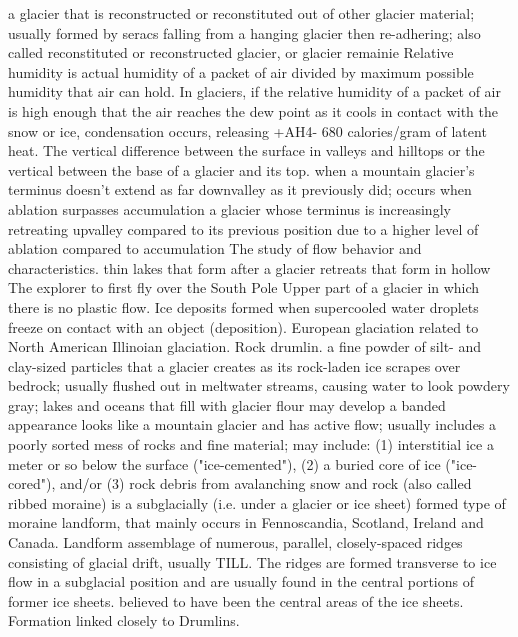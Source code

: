  a glacier that is reconstructed or reconstituted out of other glacier material; usually formed by seracs falling from a hanging glacier then re-adhering; also called reconstituted or reconstructed glacier, or glacier remainie
 Relative humidity is actual humidity of a packet of air divided by maximum possible humidity that air can hold. In glaciers, if the relative humidity of a packet of air is high enough that the air reaches the dew point as it cools in contact with the snow or ice, condensation occurs, releasing +AH4- 680 calories/gram of latent heat.
 The vertical difference between the surface in valleys and hilltops or the vertical between the base of a glacier and its top.
 when a mountain glacier's terminus doesn't extend as far downvalley as it previously did; occurs when ablation surpasses accumulation
 a glacier whose terminus is increasingly retreating upvalley compared to its previous position due to a higher level of ablation compared to accumulation
 The study of flow behavior and characteristics.
 thin lakes that form after a glacier retreats that form in hollow 
 The explorer to first fly over the South Pole
 Upper part of a glacier in which there is no plastic flow.
 Ice deposits formed when supercooled water droplets freeze on contact with an object (deposition).
 European glaciation related to North American Illinoian glaciation.
 Rock drumlin.
 a fine powder of silt- and clay-sized particles that a glacier creates as its rock-laden ice scrapes over bedrock; usually flushed out in meltwater streams, causing water to look powdery gray; lakes and oceans that fill with glacier flour may develop a banded appearance
 looks like a mountain glacier and has active flow; usually includes a poorly sorted mess of rocks and fine material; may include: (1) interstitial ice a meter or so below the surface ("ice-cemented"), (2) a buried core of ice ("ice-cored"), and/or (3) rock debris from avalanching snow and rock
 (also called ribbed moraine) is a subglacially (i.e. under a glacier or ice sheet) formed type of moraine landform, that mainly occurs in Fennoscandia, Scotland, Ireland and Canada. Landform assemblage of numerous, parallel, closely-spaced ridges consisting of glacial drift, usually TILL. The ridges are formed transverse to ice flow in a subglacial position and are usually found in the central portions of former ice sheets. believed to have been the central areas of the ice sheets. Formation linked closely to Drumlins.

